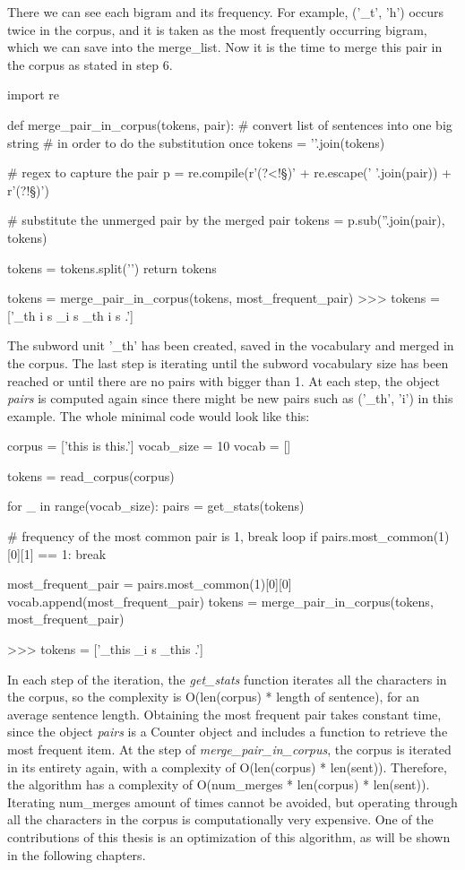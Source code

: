 There we can see each bigram and its frequency. For example, ('\_t', 'h') occurs twice in the corpus, and it is taken as the most frequently occurring bigram, which we can save into the merge\_list. Now it is the time to merge this pair in the corpus as stated in step 6.

\begin{python}
import re

def merge_pair_in_corpus(tokens, pair):
  # convert list of sentences into one big string
  # in order to do the substitution once
  tokens = '\n'.join(tokens)

  # regex to capture the pair
  p = re.compile(r'(?<!\S)' + re.escape(' '.join(pair)) + r'(?!\S)')

  # substitute the unmerged pair by the merged pair
  tokens = p.sub(''.join(pair), tokens)

  tokens = tokens.split('\n')
  return tokens

tokens = merge_pair_in_corpus(tokens, most_frequent_pair)
>>> tokens = ['_th i s _i s _th i s .']
\end{python}

The subword unit '\_th' has been created, saved in the vocabulary and merged in the corpus. The last step is iterating until the subword vocabulary size has been reached or until there are no pairs with bigger than 1. At each step, the object \emph{pairs} is computed again since there might be new pairs such as ('\_th', 'i') in this example. The whole minimal code would look like this:

\begin{python}
corpus = ['this is this.']
vocab_size = 10
vocab = []

tokens = read_corpus(corpus)

for _ in range(vocab_size):
  pairs = get_stats(tokens)

  # frequency of the most common pair is 1, break loop
  if pairs.most_common(1)[0][1] == 1:
      break

  most_frequent_pair = pairs.most_common(1)[0][0]
  vocab.append(most_frequent_pair)
  tokens = merge_pair_in_corpus(tokens, most_frequent_pair)

>>> tokens = ['_this _i s _this .']
\end{python}

In each step of the iteration, the \emph{get\_stats} function iterates all the characters in the corpus, so the complexity is O(len(corpus) * length of sentence), for an average sentence length. Obtaining the most frequent pair takes constant time, since the object \emph{pairs} is a Counter object and includes a function to retrieve the most frequent item. At the step of \emph{merge\_pair\_in\_corpus}, the corpus is iterated in its entirety again, with a complexity of O(len(corpus) * len(sent)). Therefore, the algorithm has a complexity of O(num\_merges * len(corpus) * len(sent)). Iterating num\_merges amount of times cannot be avoided, but operating through all the characters in the corpus is computationally very expensive. One of the contributions of this thesis is an optimization of this algorithm, as will be shown in the following chapters.

